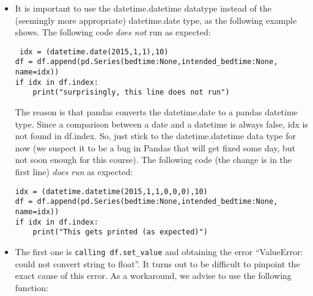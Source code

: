 \documentclass[a4paper]{report}
\theoremstyle{definition}
\newcommand{\doublequote}{\texttt{"}}
\newcommand{\singlequote}{\char13}
\begin{document}
\begin{itemize}
\setlength\itemsep{1mm}

\item It is important to use the datetime.datetime datatype instead of
the (seemingly more appropriate) datetime.date type, as the following
example shows. The following code \emph{does not} run as expected:

\texttt{\small
idx = (datetime.date(2015,1,1),10)\\
df = df.append(pd.Series({\singlequote{}bedtime\singlequote{}:None,\singlequote{}intended\_bedtime\singlequote{}:None}, name=idx))\\
if idx in df.index:\\
\mbox{}~~~~print(\doublequote{}surprisingly, this line does not
run\doublequote{})
}

The reason is that pandas converts the
datetime.date to a pandas datetime type. Since a comparison between a date
and a datetime is always false, idx is not found in df.index. So, just stick
to the datetime.datetime data type for now (we suspect it to be a bug in
Pandas that will get fixed some day, but not soon enough for this course).
The following code (the change is in the first line) \emph{does run} as
expected:

\texttt{\small idx = (datetime.datetime(2015,1,1,0,0,0),10)\\
df = df.append(pd.Series({\singlequote{}bedtime\singlequote{}:None,\singlequote{}intended\_bedtime\singlequote{}:None}, name=idx))\\
if idx in df.index:\\
\mbox{}~~~~print(\doublequote{}This gets printed (as expected)\doublequote{})
}


\item The first one is \texttt{\small calling df.set\_value} and obtaining
the error ``ValueError: could not convert string to float''. It turns
out to be difficult to pinpoint the exact cause of this error. As a
workaround, we advise to use the following function:


\end{itemize}
\end{document}
